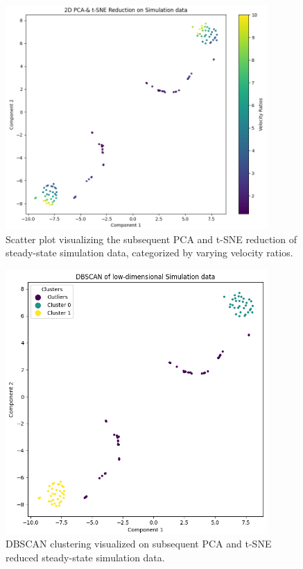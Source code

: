 \begin{figure}[ht]
\centering
\includegraphics[width=10cm]{images/Clustering/pca_tsne_sim_cmap.png}
\caption{Scatter plot visualizing the subsequent PCA and t-SNE reduction of steady-state simulation data, categorized by varying velocity ratios. }
\label{pcatsnesim}
\end{figure}
\begin{figure}[ht]
    \centering
    \includegraphics[width=10cm]{images/Clustering/dbscan_tsne_pca_sim.png}
    \caption{DBSCAN clustering visualized on subsequent PCA and t-SNE reduced steady-state simulation data.}
    \label{dbscanpcatsne}
    \end{figure}
